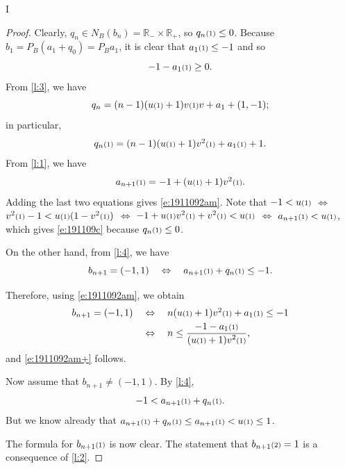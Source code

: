 I\documentclass[12pt]{article}
\newcommand{\RP}{\ensuremath{\mathbb{R}_+}}
\newcommand{\RM}{\ensuremath{\mathbb{R}_-}}
\newcommand{\kkk}[1]{\ensuremath{\textstyle\mathsmaller{({#1})}}}
\begin{document}
\begin{proof}
Clearly, $q_n \in N_B(b_n) = \RM\times \RP$, so $q_n\kkk{1}\leq 0$. 
Because $b_1 = P_B(a_1+q_0)=P_Ba_1$, it is clear that $a_1\kkk{1}\leq -1$ and so 
\begin{equation}
  -1-a_1\kkk{1}\geq 0.
\end{equation}
From \cref{l:3}, we have 
\begin{equation}
q_n = (n-1)(u\kkk{1}+1)v\kkk{1}v + a_1+(1,-1);
\end{equation}
in particular, 
\begin{equation}
q_n\kkk{1} = (n-1)(u\kkk{1}+1)v^2\kkk{1} + a_1\kkk{1}+1. 
\end{equation}
From \cref{l:1}, we have 
\begin{equation}
  a_{n+1}\kkk{1}= -1+(u\kkk{1}+1)v^2\kkk{1}.
\end{equation}
Adding the last two equations gives \eqref{e:1911092am}.
Note that $-1 < u\kkk{1}$
$\Leftrightarrow$
$v^2\kkk{1}-1 < u\kkk{1}(1-v^2\kkk{1})$
$\Leftrightarrow$
$-1+u\kkk{1}v^2\kkk{1}+v^2\kkk{1} < u\kkk{1}$
$\Leftrightarrow$
$a_{n+1}\kkk{1}<u\kkk{1}$, which gives
\eqref{e:191109c} because $q_n\kkk{1}\leq 0$. 
  
On the other hand, from \cref{l:4}, we have
\begin{equation}
b_{n+1} = (-1,1)
\quad\Leftrightarrow\quad
a_{n+1}\kkk{1}+ q_n\kkk{1} \leq -1.
\end{equation}

Therefore, using \eqref{e:1911092am}, we obtain 
\begin{subequations}
\begin{align}
b_{n+1} = (-1,1)
&\quad\Leftrightarrow\quad
n(u\kkk{1}+1)v^2\kkk{1} + a_1\kkk{1} \leq -1\\
&\quad\Leftrightarrow\quad
n \leq \frac{-1-a_1\kkk{1}}{(u\kkk{1}+1)v^2\kkk{1}},
\end{align}
\end{subequations}
and \eqref{e:1911092am+} follows.


Now assume that $b_{n+1} \neq (-1,1)$.
By \cref{l:4}, 
\begin{equation}
 -1< a_{n+1}\kkk{1}+q_n\kkk{1}.
\end{equation}
But we know already that 
$a_{n+1}\kkk{1}+q_n\kkk{1} \leq a_{n+1}\kkk{1}<u\kkk{1}\leq 1$.

The formula for $b_{n+1}\kkk{1}$ is now clear. 
The statement that $b_{n+1}\kkk{2}=1$ is a consequence of \cref{l:2}. 
\end{proof}
\end{document}
